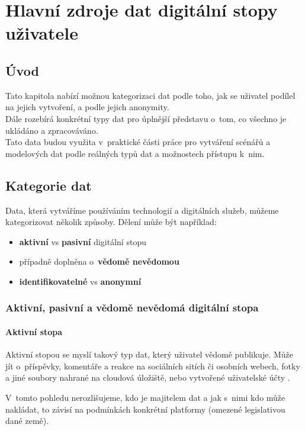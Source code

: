 \chapter{Hlavní zdroje dat digitální stopy uživatele}

\section*{Úvod}
Tato kapitola nabízí možnou kategorizaci dat podle toho, jak se uživatel podílel na jejich vytvoření, a podle jejich anonymity.\\
Dále rozebírá konkrétní typy dat pro úplnější představu o~tom, co všechno je ukládáno a zpracováváno.\\
Tato data budou využita v~praktické části práce pro vytváření scénářů a modelových dat podle reálných typů dat a možnostech přístupu k~nim.

\section{Kategorie dat}
Data, která vytváříme používáním technologií a digitálních služeb, můžeme kategorizovat několik způsoby. Dělení může být například:
\begin{itemize}
	\item \textbf{aktivní} vs \textbf{pasivní} digitální stopu \citep{pew-digital-footprint}
    \item případně doplněna o~\textbf{vědomě nevědomou} \citep{fish-digital-footprint}
\item \textbf{identifikovatelné} vs \textbf{anonymní}
\end{itemize}


\subsection{Aktivní, pasivní a vědomě nevědomá digitální stopa}
\subsubsection*{Aktivní stopa}
Aktivní stopou se myslí takový typ dat, který uživatel vědomě publikuje. Může jít o~příspěvky, komentáře a reakce na sociálních sitích či osobních webech, fotky a jiné soubory nahrané na cloudová úložiště, nebo vytvořené uživatelské účty \citep{pew-digital-footprint}.

V~tomto pohledu nerozlišujeme, kdo je majitelem dat a jak s~nimi kdo může nakládat, to závisí na podmínkách konkrétní platformy (omezené legislativou dané země).

